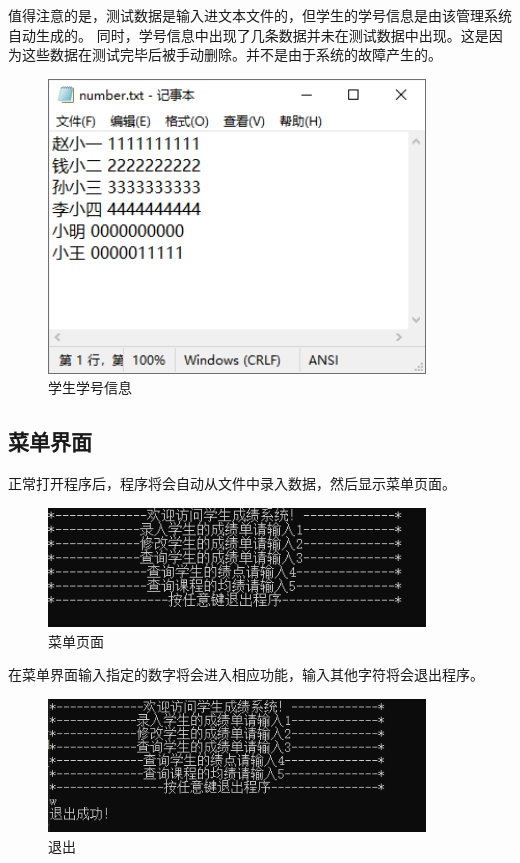 \documentclass[fontset=windows]{article}
\begin{document}
值得注意的是，测试数据是输入进文本文件的，但学生的学号信息是由该管理系统自动生成的。
同时，学号信息中出现了几条数据并未在测试数据中出现。这是因为这些数据在测试完毕后被手动删除。并不是由于系统的故障产生的。
\begin{figure}
	\begin{center}
		\vspace{-1.5cm}
		\includegraphics[width = 10cm]{学生信息.png}
		\vspace{0.5cm}
		\caption{学生学号信息}
	\end{center}
\end{figure}
\vspace{5cm}

\subsection{菜单界面}
正常打开程序后，程序将会自动从文件中录入数据，然后显示菜单页面。

\begin{figure}[h!]
	\begin{center}
		\includegraphics[width = 10cm]{菜单界面.png}
		\caption{菜单页面}
	\end{center}
\end{figure}

在菜单界面输入指定的数字将会进入相应功能，输入其他字符将会退出程序。
\begin{figure}[h!]
	\begin{center}
		\includegraphics[width = 10cm]{退出.png}
		\caption{退出}
	\end{center}
\end{figure}
\newpage
\end{document}
